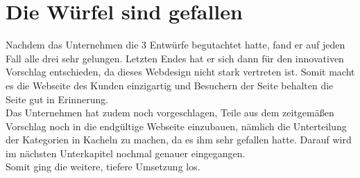 \section{Die Würfel sind gefallen}
Nachdem das Unternehmen die 3 Entwürfe begutachtet hatte, fand er auf jeden Fall alle drei sehr gelungen. Letzten Endes hat er sich dann für den innovativen Vorschlag entschieden, da dieses Webdesign nicht stark vertreten ist. Somit macht es die Webseite des Kunden einzigartig und Besuchern der Seite behalten die Seite gut in Erinnerung. 
\\
Das Unternehmen hat zudem noch vorgeschlagen, Teile aus dem zeitgemäßen Vorschlag noch in die endgültige Webseite einzubauen, nämlich die Unterteilung der Kategorien in Kacheln zu machen, da es ihm sehr gefallen hatte. Darauf wird im nächsten Unterkapitel nochmal genauer eingegangen.
\\
Somit ging die weitere, tiefere Umsetzung los.